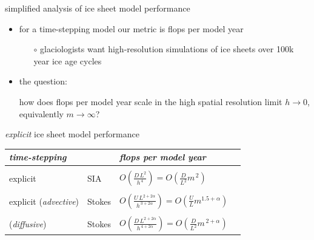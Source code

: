 \documentclass[svgnames,
               hyperref={colorlinks,citecolor=DeepPink4,linkcolor=FireBrick,urlcolor=Maroon},
               usepdftitle=false]  %
               {beamer}
\newcommand{\oo}[1]{\displaystyle O\left(#1\right)}
\begin{document}
\begin{frame}{simplified analysis of ice sheet model performance}

\begin{itemize}
\item for a time-stepping model our metric is \alert{flops per model year}
    \begin{itemize}
    \item[$\circ$] glaciologists want high-resolution simulations of ice sheets over 100k year ice age cycles
    \end{itemize}

\bigskip
\item the question:

\bigskip
\begin{center}
\begin{minipage}{0.82\textwidth}
how does flops per model year \alert{scale} in the \alert{high spatial resolution limit} $h\to 0$, equivalently $m\to \infty$?
\end{minipage}
\end{center}
\end{itemize}
\end{frame}


\begin{frame}{\emph{explicit} ice sheet model performance}

\begin{tabular}{llll}
\emph{time-stepping} &  & \emph{flops per model year} \\ \hline
\\
explicit & SIA    & $\oo{\frac{D\, L^2}{h^{\,4}}} = \oo{\frac{D}{L^2} m^{\,2}}$ \\
\\
explicit ({\footnotesize \emph{advective}}) & Stokes & $\oo{\frac{U \,L^{2+2\alpha}}{h^{\,3+2\alpha}}} = \oo{\frac{U}{L} m^{1.5+\alpha}}$ \\
\\
\phantom{explicit} ({\footnotesize \emph{diffusive}})  & Stokes & $\oo{\frac{D\, L^{2+2\alpha}}{h^{\,4+2\alpha}}} = \oo{\frac{D}{L^2} m^{\,2+\alpha}}$
\end{tabular}
\end{frame}
\end{document}

